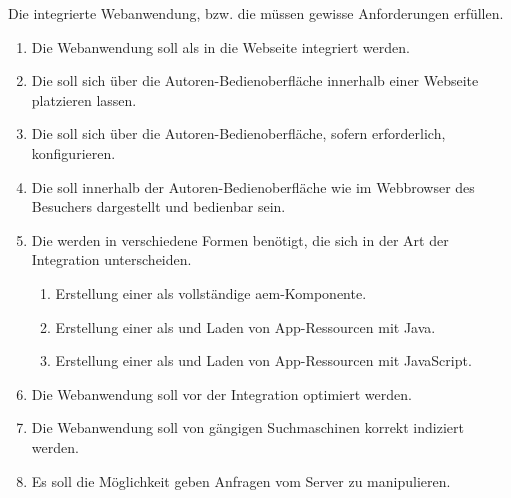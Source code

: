 Die integrierte Webanwendung, bzw. die \ajc müssen gewisse Anforderungen erfüllen.


\begin{enumerate}[label=A\arabic*:]
	
	\item Die Webanwendung soll als \ajc in die Webseite integriert werden.
	\item Die \ajc soll sich über die Autoren-Bedienoberfläche innerhalb einer Webseite platzieren lassen.
	\item Die \ajc soll sich über die Autoren-Bedienoberfläche, sofern erforderlich, konfigurieren.
	\item Die \ajc soll innerhalb der Autoren-Bedienoberfläche wie im Webbrowser des Besuchers dargestellt und bedienbar sein.
	
	\item Die \ajc werden in verschiedene Formen benötigt, die sich in der Art der Integration unterscheiden.
	\begin{enumerate}[label=A\arabic{enumi}.\arabic*:]
		\item Erstellung einer \ajc als vollständige \ac{aem}-Komponente.
		\item Erstellung einer \ajc als und Laden von App-Ressourcen mit Java.
		\item Erstellung einer \ajc als und Laden von App-Ressourcen mit JavaScript.
	\end{enumerate}

	\item Die Webanwendung soll vor der Integration optimiert werden.
	\item Die Webanwendung soll von gängigen Suchmaschinen korrekt indiziert werden.
	
	\item Es soll die Möglichkeit geben Anfragen vom Server zu manipulieren.
\end{enumerate}

